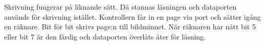 \documentclass[main.tex]{subfiles}
\begin{document}
Skrivning fungerar på liknande sätt. Då stannas läsningen och dataporten
används för skrivning istället. Kontrollern får in en page via port 
och sätter igång en räknare. Bit för bit skrivs page:n till bildminnet. När
räknaren har nått bit 5 eller bit 7 är den färdig och dataporten överlåts åter
för läsning.
\end{document}
